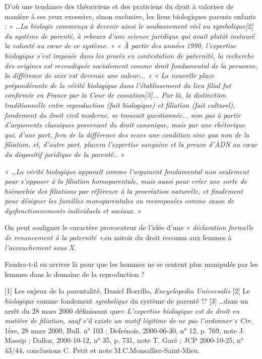  D'où une tendance des théoriciens et des praticiens du droit à valoriser de manière à ses yeux excessive, sinon exclusive, les liens biologiques parents enfants : \emph{ » …La biologie commença à devenir ainsi le soubassement réel ou symbolique[2] du système de parenté, à rebours d'une science juridique qui avait plutôt instauré la volonté au cœur de ce système. » « À partir des années 1990, l'expertise biologique s'est imposée dans les procès en contestation de paternité, la recherche des origines est revendiquée socialement comme droit fondamental de la personne, la différence de sexe est devenue une valeur... » « La nouvelle place prépondérante de la vérité biologique dans l'établissement du lien filial fut confirmée en France par la Cour de cassation[3]... Par là, la distinction traditionnelle entre reproduction (fait biologique) et filiation (fait culturel), fondement du droit civil moderne, se trouvait questionnée... non pas à partir d'arguments classiques provenant du droit canonique, mais par une rhétorique qui, d'une part, fera de la différence des sexes une condition sine qua non de la filiation, et, d'autre part, placera l'expertise sanguine et la preuve d'ADN au cœur du dispositif juridique de la parenté…} » 
 
 \emph{« …La vérité biologique apparaît comme l'argument fondamental non seulement pour s'opposer à la filiation homoparentale, mais aussi pour créer une sorte de hiérarchie des filiations par référence à la procréation naturelle, et finalement pour désigner les familles monoparentales ou recomposées comme cause de dysfonctionnements individuels et sociaux.} »
 
 On peut souligner le caractère provocateur de l'idée d'une\emph{ « déclaration formelle de renoncement à la paternité »,}en miroir du droit reconnu aux femmes à \emph{l'accouchement sous X.}
 
 Faudra-t-il en arriver là pour que les hommes ne se sentent plus manipulés par les femmes dans le domaine de la reproduction ?
 
[1] Les enjeux de la parentalité, Daniel Borrillo, \emph{Encyclopedia Universalis}
[2] Le \emph{biologique} comme fondement \emph{symbolique} du système de parenté !?
[3] …dans un arrêt du 28 mars 2000 définissant que\emph{}« \emph{L'expertise biologique est de droit en matière de filiation, sauf s'il existe un motif légitime de ne pas l'ordonner} » Civ. 1ère, 28 mars 2000, Bull. n° 103 ; Defrénois, 2000-06-30, n° 12, p. 769, note J. Massip ; Dalloz, 2000-10-12, n° 35, p. 731, note T. Garé ; JCP 2000-10-25, n° 43/44, conclusions C. Petit et note M.C.Monsallier-Saint-Mieu.